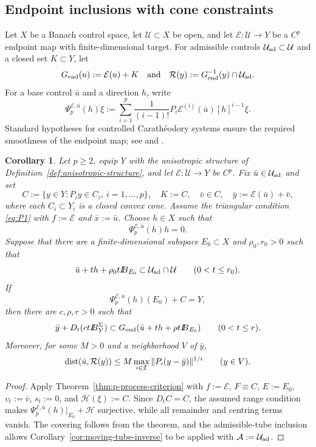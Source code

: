 \documentclass[11pt]{amsart}
\newtheorem{corollary}[theorem]{Corollary}
\theoremstyle{definition}
\theoremstyle{remark}
\newcommand{\bx}{\bar x}
\newcommand{\dist}{\mathop{\rm dist}\nolimits}
\def\ball{{I\kern -.35em B}}
\begin{document}
	
	
	
	
	\subsection{Endpoint inclusions with cone constraints}
	
	Let $X$ be a Banach control space, let $\mathcal U\subset X$ be open,
	and let $\mathcal E:\mathcal U\longrightarrow Y$ be a $C^p$ endpoint
	map with finite-dimensional target. For admissible controls
	$\mathcal U_{\rm ad}\subset\mathcal U$ and a closed set $K\subset Y$,
	let
	$$
	G_{\rm end}(u):=\mathcal E(u)+K
	\quad\text{and}\quad
	\mathcal R(y):=G_{\rm end}^{-1}(y)\cap\mathcal U_{\rm ad}.
	$$
	For a base control $\bar u$ and a direction $h$, write
	$$
	\Psi_p^{\mathcal E,\bar u}(h)\xi
	:=
	\sum_{i=1}^p\frac{1}{(i-1)!}
	P_i\mathcal E^{(i)}(\bar u)[h]^{i-1}\xi.
	$$
	Standard hypotheses for controlled Carath\'eodory systems ensure the
	required smoothness of the endpoint map; see
	\cite[Section~20.3]{AgrachevSachkov} and \cite[p.~388]{TrelatEndpoint}.
	
	\begin{corollary}
		\label{cor:terminal-cone-process}
		Let $p\ge2$, equip $Y$ with the anisotropic structure of
		Definition~\ref{def:anisotropic-structure}, and let
		$\mathcal E:\mathcal U\longrightarrow Y$ be $C^p$. Fix
		$\bar u\in\mathcal U_{\rm ad}$ and set
		$$
		C:=\{y\in Y:P_i y\in C_i,\ i=1,\ldots,p\},
		\quad
		K:=C,
		\quad
		\bar v\in C,
		\quad
		\bar y:=\mathcal E(\bar u)+\bar v,
		$$
		where each $C_i\subset Y_i$ is a closed convex cone. Assume the
		triangular condition \eqref{eq:P1} with
		$f:=\mathcal E$ and $\bx:=\bar u$. Choose $h\in X$ such that
		$$
		\Psi_p^{\mathcal E,\bar u}(h)h=0.
		$$
		Suppose that there are a finite-dimensional subspace $E_0\subset X$ and
		$\rho_0,r_0>0$ such that
		$$
		\bar u+th+\rho_0t\ball_{E_0}
		\subset\mathcal U_{\rm ad}\cap\mathcal U
		\qquad (0<t\le r_0).
		$$
		If
		$$
		\Psi_p^{\mathcal E,\bar u}(h)(E_0)+C=Y,
		$$
		then there are $c,\rho,r>0$ such that
		$$
		\bar y+D_t(ct\ball_Y^\Sigma)
		\subset
		G_{\rm end}(\bar u+th+\rho t\ball_{E_0})
		\qquad (0<t\le r).
		$$
		Moreover, for some $M>0$ and a neighborhood $V$ of $\bar y$,
		$$
		\dist(\bar u,\mathcal R(y))
		\le
		M\max_{i\in\mathcal I}\|P_i(y-\bar y)\|^{1/i}
		\qquad (y\in V).
		$$
	\end{corollary}
	
	\begin{proof}
		Apply Theorem~\ref{thm:p-process-criterion} with
		$f:=\mathcal E$, $F\equiv C$, $E:=E_0$, $v_t:=\bar v$,
		$s_t:=0$, and $\mathcal H(\xi):=C$. Since $D_tC=C$, the assumed range
		condition makes $\Psi_p^{\mathcal E,\bar u}(h)\vert_{E_0}+\mathcal H$
		surjective, while all remainder and centring terms vanish. The covering
		follows from the theorem, and the admissible-tube inclusion allows
		Corollary~\ref{cor:moving-tube-inverse} to be applied with
		$\mathcal A:=\mathcal U_{\rm ad}$.
	\end{proof}
	
\end{document}
